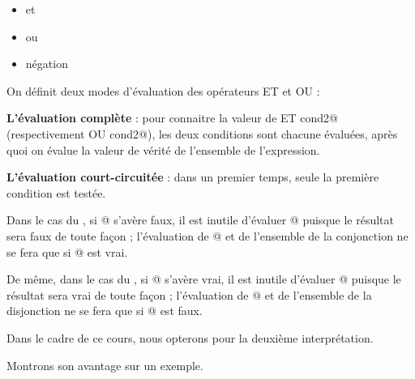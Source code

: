 \documentclass[11pt,a4paper]{article}
\begin{document}
					\begin{itemize}
				
			\item \verb@ET@ et 
			\item \verb@OU@ ou 
			\item \verb@NON@ n\'egation 
					\end{itemize}
				
            \par
        
            On d\'efinit deux modes d'\'evaluation des op\'erateurs ET et OU :
          
            \par
        \textbf{L'\'evaluation compl\`ete} :
          pour connaitre la valeur de  ET cond2@ 
          (respectivement  OU cond2@), les deux
          conditions sont chacune \'evalu\'ees, apr\`es quoi on \'evalue la valeur de v\'erit\'e de l'ensemble de
          l'expression.
          
            \par
        \textbf{L'\'evaluation court-circuit\'ee} :
          dans un premier temps, seule la premi\`ere condition est test\'ee. 
          
            \par
        
          Dans le cas du \verb@ET@, si @ s'av\`ere faux, 
          il est inutile d'\'evaluer @ puisque le r\'esultat sera faux de toute fa\c con ;
          l'\'evaluation de @ 
          et de l'ensemble de la conjonction ne se fera que si @ est vrai.
          
            \par
        
          De m\^eme, dans le cas du \verb@OU@, si @ s'av\`ere vrai, 
          il est inutile d'\'evaluer @ puisque le
          r\'esultat sera vrai de toute fa\c con ; l'\'evaluation de @ et de l'ensemble de la disjonction
          ne se fera que si @ est faux.
          
            \par
        
          Dans le cadre de ce cours, nous opterons pour la deuxi\`eme interpr\'etation. 
          
            \par
        
          Montrons son avantage sur un exemple. 
          
\end{document}
